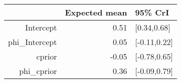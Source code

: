 \begin{tabular}{rrl}
  \hline
 & Expected mean & 95\% CrI \\ 
  \hline
Intercept & 0.51 & [0.34,0.68] \\ 
  phi\_Intercept & 0.05 & [-0.11,0.22] \\ 
  cprior & -0.05 & [-0.78,0.65] \\ 
  phi\_cprior & 0.36 & [-0.09,0.79] \\ 
   \hline
\end{tabular}

